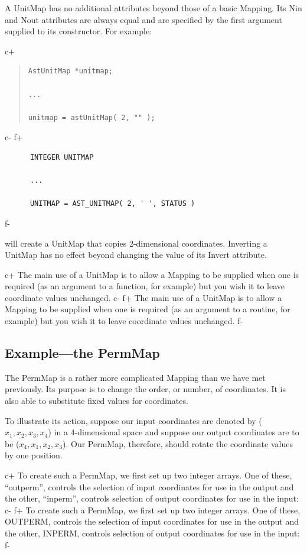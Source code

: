 \documentclass[twoside,11pt]{article}
\begin{document}
A UnitMap has no additional attributes beyond those of a basic
Mapping. Its Nin and Nout attributes are always equal and are
specified by the first argument supplied to its constructor. For
example:

c+
\begin{quote}
\small
\begin{verbatim}
AstUnitMap *unitmap;

...

unitmap = astUnitMap( 2, "" );
\end{verbatim}
\normalsize
\end{quote}
c-
f+
\small
\begin{verbatim}
      INTEGER UNITMAP

      ...

      UNITMAP = AST_UNITMAP( 2, ' ', STATUS )
\end{verbatim}
\normalsize
f-

will create a UnitMap that copies 2-dimensional coordinates. Inverting
a UnitMap has no effect beyond changing the value of its Invert
attribute.

c+
The main use of a UnitMap is to allow a Mapping to be supplied when one
is required (as an argument to a function, for example) but you wish
it to leave coordinate values unchanged.
c-
f+
The main use of a UnitMap is to allow a Mapping to be supplied when one
is required (as an argument to a routine, for example) but you wish
it to leave coordinate values unchanged.
f-

\subsection{\label{ss:permmapexample}Example---the PermMap}

The PermMap is a rather more complicated Mapping than we have met
previously.  Its purpose is to change the order, or number, of
coordinates. It is also able to substitute fixed values for
coordinates.

To illustrate its action, suppose our input coordinates are denoted by
($x_1,x_2,x_3,x_4$) in a 4-dimensional space and suppose our output
coordinates are to be ($x_4,x_1,x_2,x_3$). Our PermMap, therefore,
should rotate the coordinate values by one position.

c+
To create such a PermMap, we first set up two integer arrays. One of
these, ``outperm'', controls the selection of input coordinates for
use in the output and the other, ``inperm'', controls selection of
output coordinates for use in the input:
c-
f+
To create such a PermMap, we first set up two integer arrays. One of
these, OUTPERM, controls the selection of input coordinates for use in
the output and the other, INPERM, controls selection of output
coordinates for use in the input:
f-
\end{document}
